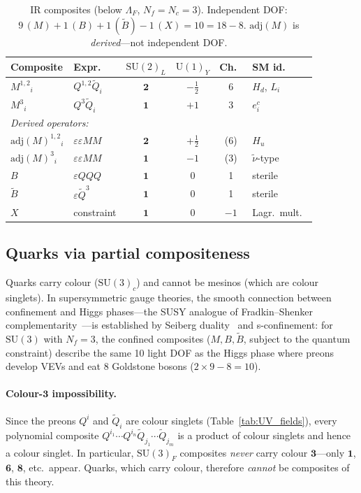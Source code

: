 \documentclass[aps,prd,twocolumn,showpacs,preprintnumbers,superscriptaddress,floatfix]{revtex4-2}
\newcommand{\SU}{\mathrm{SU}}
\newcommand{\UU}{\mathrm{U}}
\newcommand{\Nf}{N_{\!f}}
\newcommand{\Nc}{N_{\!c}}
\newcommand{\adj}{\mathrm{adj}}
\begin{document}
\begin{table}
\centering\small
\caption{IR composites (below $\Lambda_F$, $\Nf = \Nc = 3$).
  Independent DOF: $9\,(M) + 1\,(B) + 1\,(\tilde{B})
  - 1\,(X) = 10 = 18 - 8$.
  $\adj(M)$ is \emph{derived}---not independent DOF.}
\label{tab:IR_composites}
\begin{tabular}{llcccl}
\hline
Composite & Expr.\ & $\SU(2)_L$ & $\UU(1)_Y$ & Ch.\ & SM id.\ \\
\hline
$M^{1,2}{}_i$ & $Q^{1,2}\tilde{Q}_i$ & $\mathbf{2}$ & $-\tfrac{1}{2}$ & 6 & $H_d$, $L_i$ \\
$M^{3}{}_i$ & $Q^{3}\tilde{Q}_i$ & $\mathbf{1}$ & $+1$ & 3 & $e^c_i$ \\
\hline
\multicolumn{6}{l}{\textit{Derived operators:}} \\
$\adj(M)^{1,2}{}_i$ & $\varepsilon\varepsilon MM$ & $\mathbf{2}$ & $+\tfrac{1}{2}$ & (6) & $H_u$ \\
$\adj(M)^{3}{}_i$ & $\varepsilon\varepsilon MM$ & $\mathbf{1}$ & $-1$ & (3) & $\tilde\nu$-type \\
$B$ & $\varepsilon QQQ$ & $\mathbf{1}$ & $0$ & 1 & sterile \\
$\tilde{B}$ & $\varepsilon\tilde{Q}^3$ & $\mathbf{1}$ & $0$ & 1 & sterile \\
$X$ & constraint & $\mathbf{1}$ & $0$ & $-1$ & Lagr.\ mult.\ \\
\hline
\end{tabular}
\end{table}


\subsection{Quarks via partial compositeness}
\label{sec:composites_quarks}

Quarks carry colour ($\SU(3)_c$) and cannot be mesinos (which are
colour singlets).
In supersymmetric gauge theories, the smooth connection between
confinement and Higgs phases---the SUSY analogue of
Fradkin--Shenker complementarity~\cite{FradkinShenker:1979}---is
established by Seiberg
duality~\cite{Seiberg:1994bz} and s-confinement: for $\SU(3)$
with $\Nf = 3$, the confined composites ($M, B, \tilde{B}$,
subject to the quantum constraint) describe the same 10 light DOF
as the Higgs phase where preons develop VEVs and eat 8 Goldstone
bosons ($2 \times 9 - 8 = 10$).

\paragraph{Colour-$\mathbf{3}$ impossibility.}
Since the preons $Q^i$ and $\tilde{Q}_i$ are colour singlets
(Table~\ref{tab:UV_fields}), every polynomial composite
$Q^{i_1}\cdots Q^{i_n}\tilde{Q}_{j_1}\cdots\tilde{Q}_{j_m}$ is
a product of colour singlets and hence a colour singlet.
In particular, $\SU(3)_F$ composites \emph{never} carry colour
$\mathbf{3}$---only $\mathbf{1}$, $\mathbf{6}$, $\mathbf{8}$,
etc.\ appear.
Quarks, which carry colour, therefore \emph{cannot} be composites
of this theory.
\end{document}
